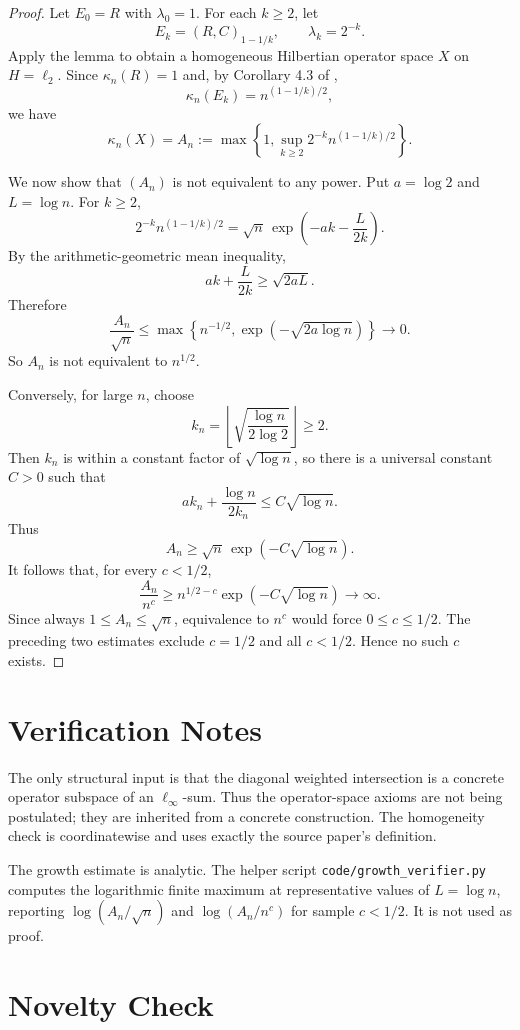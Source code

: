 \documentclass[11pt]{article}
\newcommand{\elltwo}{\ell_2}
\newcommand{\RC}[1]{(R,C)_{#1}}
\begin{document}
\begin{proof}
Let \(E_0=R\) with \(\lambda_0=1\). For each \(k\ge 2\), let
\[
E_k=\RC{1-1/k},
\qquad
\lambda_k=2^{-k}.
\]
Apply the lemma to obtain a homogeneous Hilbertian operator space \(X\) on \(H=\elltwo\). Since \(\kappa_n(R)=1\) and, by Corollary 4.3 of \cite{BCD2404},
\[
\kappa_n(E_k)=n^{(1-1/k)/2},
\]
we have
\[
\kappa_n(X)=A_n
:=\max\left\{1,\sup_{k\ge 2}2^{-k}n^{(1-1/k)/2}\right\}.
\]

We now show that \((A_n)\) is not equivalent to any power. Put \(a=\log 2\) and \(L=\log n\). For \(k\ge2\),
\[
2^{-k}n^{(1-1/k)/2}
=\sqrt n\,\exp\left(-ak-\frac{L}{2k}\right).
\]
By the arithmetic-geometric mean inequality,
\[
ak+\frac{L}{2k}\ge \sqrt{2aL}.
\]
Therefore
\[
\frac{A_n}{\sqrt n}
\le \max\left\{n^{-1/2},\exp(-\sqrt{2a\log n})\right\}\longrightarrow 0.
\]
So \(A_n\) is not equivalent to \(n^{1/2}\).

Conversely, for large \(n\), choose
\[
k_n=\left\lfloor\sqrt{\frac{\log n}{2\log 2}}\right\rfloor\ge 2.
\]
Then \(k_n\) is within a constant factor of \(\sqrt{\log n}\), so there is a universal constant \(C>0\) such that
\[
ak_n+\frac{\log n}{2k_n}\le C\sqrt{\log n}.
\]
Thus
\[
A_n\ge \sqrt n\,\exp(-C\sqrt{\log n}).
\]
It follows that, for every \(c<1/2\),
\[
\frac{A_n}{n^c}\ge
n^{1/2-c}\exp(-C\sqrt{\log n})\longrightarrow\infty.
\]
Since always \(1\le A_n\le\sqrt n\), equivalence to \(n^c\) would force \(0\le c\le 1/2\). The preceding two estimates exclude \(c=1/2\) and all \(c<1/2\). Hence no such \(c\) exists.
\end{proof}

\section*{Verification Notes}

The only structural input is that the diagonal weighted intersection is a concrete operator subspace of an \(\ell_\infty\)-sum. Thus the operator-space axioms are not being postulated; they are inherited from a concrete construction. The homogeneity check is coordinatewise and uses exactly the source paper's definition.

The growth estimate is analytic. The helper script \texttt{code/growth\_verifier.py} computes the logarithmic finite maximum at representative values of \(L=\log n\), reporting \(\log(A_n/\sqrt n)\) and \(\log(A_n/n^c)\) for sample \(c<1/2\). It is not used as proof.

\section*{Novelty Check}
\end{document}
